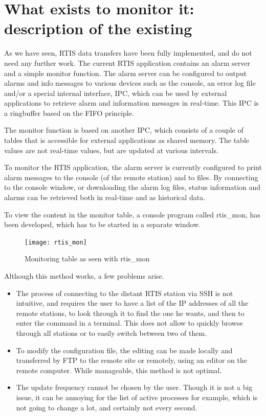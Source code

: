 \documentclass{themeensg}
\begin{document}
\clearpage

\section{What exists to monitor it: description of the existing}

As we have seen, RTIS data transfers have been fully implemented, and do not need any further work. The current RTIS application contains an alarm server and a simple monitor function. The alarm server can be configured to output alarms and info messages to various devices such as the console, an error log file and/or a special internal interface, IPC, which can be used by external applications to retrieve alarm and information messages in real-time. This IPC is a ringbuffer based on the FIFO principle. 

The monitor function is based on another IPC, which consists of a couple of tables that is accessible for external applications as shared memory. The table values are not real-time values, but are updated at various intervals.

To monitor the RTIS application, the alarm server is currently configured to print alarm messages to the console (of the remote station) and to files. By connecting to the console window, or downloading the alarm log files, status information and alarms can be retrieved both in real-time and as historical data.

To view the content in the monitor table, a console program called rtis\_mon, has been developed, which has to be started in a separate window.

\begin{figure}[ht]
	\centering
	\texttt{[image: rtis\_mon]}
	\caption{Monitoring table as seen with rtis\_mon}
\end{figure}

Although this method works, a few problems arise.
\begin{itemize}
	\item The process of connecting to the distant RTIS station via SSH is not intuitive, and requires the user to have a list of the IP addresses of all the remote stations, to look through it to find the one he wants, and then to enter the command in a terminal. This does not allow to quickly browse through all stations or to easily switch between two of them.
	\item To modify the configuration file, the editing can be made locally and transferred by FTP to the remote site or remotely, using an editor on the remote computer. While manageable, this method is not optimal.
	\item The update frequency cannot be chosen by the user. Though it is not a big issue, it can be annoying for the list of active processes for example, which is not going to change a lot, and certainly not every second.
\end{itemize}
\end{document}
